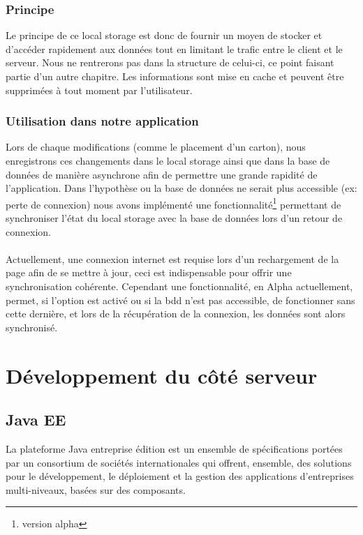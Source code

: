 \subsubsection{Principe}
Le principe de ce local storage est donc de fournir un moyen de stocker et d'accéder rapidement aux données tout en limitant le trafic entre le client et le serveur. Nous ne rentrerons pas dans la structure de celui-ci, ce point faisant partie d'un autre chapitre. Les informations sont mise en cache et peuvent être supprimées à tout moment par l'utilisateur.
\subsubsection{Utilisation dans notre application}
Lors de chaque modifications (comme le placement d'un carton), nous enregistrons ces changements dans le local storage ainsi que dans la base de données de manière asynchrone afin de permettre une grande rapidité de l'application. Dans l'hypothèse ou la base de données ne serait plus accessible (ex: perte de connexion) nous avons implémenté une fonctionnalité\footnote{version alpha} permettant de synchroniser l'état du local storage avec la base de données lors d'un retour de connexion.\\
\\
Actuellement, une connexion internet est requise lors d'un rechargement de la page afin de se mettre à jour, ceci est indispensable pour offrir une synchronisation cohérente. Cependant une fonctionnalité, en Alpha actuellement, permet, si l'option est activé ou si la bdd n'est pas accessible, de fonctionner sans cette dernière, et lors de la récupération de la connexion, les données sont alors synchronisé.



\section{Développement du côté serveur}

\subsection{Java EE}

La plateforme Java entreprise édition est un ensemble de spécifications portées par un consortium de sociétés internationales qui offrent, ensemble, des solutions pour le développement, le déploiement et la gestion des applications d'entreprises multi-niveaux, basées sur des composants.

